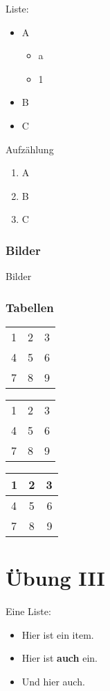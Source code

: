 \documentclass[a4paper, ngerman, oneside, 10pt]{article}
\begin{document}
Liste:
\begin{itemize}
	\item A
	      \begin{itemize}
		      \item a
		      \item 1
	      \end{itemize}
	\item B
	\item C
\end{itemize}
Aufzählung
\begin{enumerate}
	\item A
	\item B
	\item C
\end{enumerate}

\subsubsection{Bilder}
Bilder


\subsubsection{Tabellen}
\begin{tabular}{lcr}
	1 & 2 & 3 \\
	4 & 5 & 6 \\
	7 & 8 & 9 \\
\end{tabular}

\begin{tabular}{l|c|r}
	1 & 2 & 3 \\
	4 & 5 & 6 \\
	7 & 8 & 9 \\
\end{tabular}

\begin{center}
	\begin{tabular}{|l|c|r|}
		\hline
		1 & 2 & 3 \\
		\hline
		4 & 5 & 6 \\
		\hline
		7 & 8 & 9 \\
		\hline
	\end{tabular}
\end{center}
\section*{Übung III}
Eine Liste:
\begin{itemize}
	\item Hier ist ein item.
	\item Hier ist \textbf{auch} ein.
	\item Und hier auch.
\end{itemize}
\end{document}
